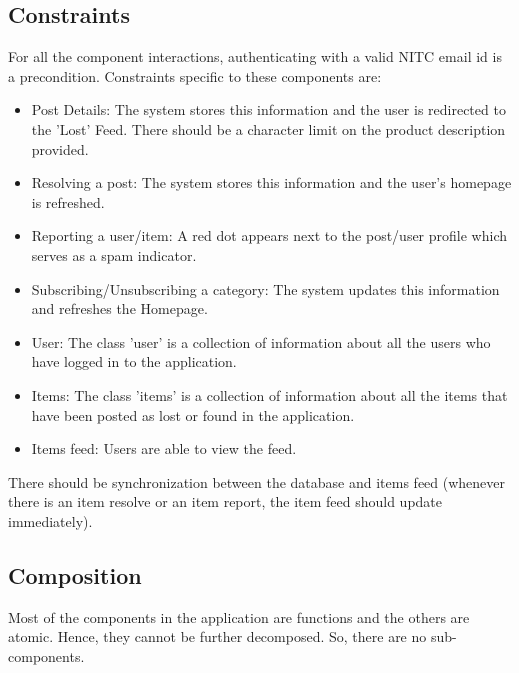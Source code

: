 \documentclass[a4paper,12pt]{article}
\begin{document}
\subsection{Constraints}
For all the component interactions, authenticating with a valid NITC email id is a precondition. Constraints specific to these components are:\\
\begin{itemize}
\item Post Details: The system stores this information and the user is redirected to the 'Lost' Feed. There should be a character limit on the product description provided.  
\item Resolving a post: The system stores this information and the user's homepage is refreshed.
\item Reporting a user/item: A red dot appears next to the post/user profile which serves as a spam indicator. 
\item Subscribing/Unsubscribing a category: The system updates this information and refreshes the Homepage. 
\item User: The class 'user' is a collection of information about all the users who have logged in to the application. 
\item Items: The class 'items' is a collection of information about all the items that have been posted as lost or found in the application. 
\item Items feed: Users are able to view the feed.
\end{itemize}
There should be synchronization between the database and items feed (whenever there is an item resolve or an item report, the item feed should update immediately).
\subsection{Composition}
Most of the components in the application are functions and the others are atomic. Hence, they cannot be further decomposed. So, there are no sub-components.
\end{document}
